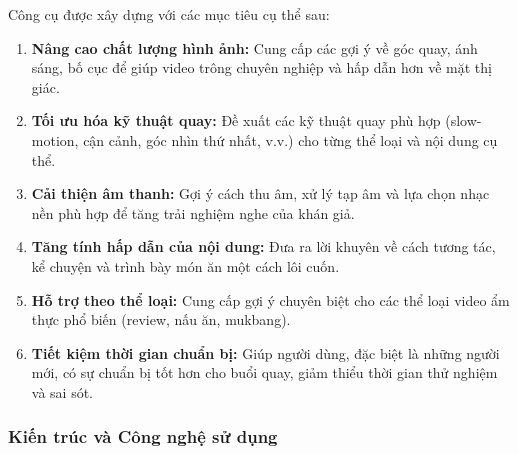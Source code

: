 \noindent
Công cụ được xây dựng với các mục tiêu cụ thể sau:
\begin{enumerate}
    \item \textbf{Nâng cao chất lượng hình ảnh:} Cung cấp các gợi ý về góc quay, ánh sáng, bố cục để giúp video trông chuyên nghiệp và hấp dẫn hơn về mặt thị giác.

    \item \textbf{Tối ưu hóa kỹ thuật quay:} Đề xuất các kỹ thuật quay phù hợp (slow-motion, cận cảnh, góc nhìn thứ nhất, v.v.) cho từng thể loại và nội dung cụ thể.
    
    \item \textbf{Cải thiện âm thanh:} Gợi ý cách thu âm, xử lý tạp âm và lựa chọn nhạc nền phù hợp để tăng trải nghiệm nghe của khán giả.
    
    \item \textbf{Tăng tính hấp dẫn của nội dung:} Đưa ra lời khuyên về cách tương tác, kể chuyện và trình bày món ăn một cách lôi cuốn.
    
    \item \textbf{Hỗ trợ theo thể loại:} Cung cấp gợi ý chuyên biệt cho các thể loại video ẩm thực phổ biến (review, nấu ăn, mukbang).
    
    \item \textbf{Tiết kiệm thời gian chuẩn bị:} Giúp người dùng, đặc biệt là những người mới, có sự chuẩn bị tốt hơn cho buổi quay, giảm thiểu thời gian thử nghiệm và sai sót.
\end{enumerate}

\subsubsection{Kiến trúc và Công nghệ sử dụng}

